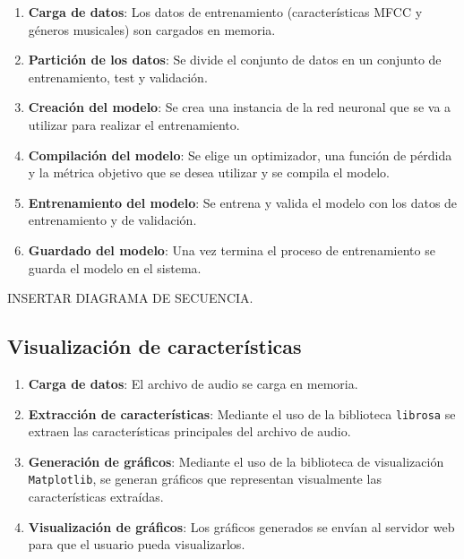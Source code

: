 \begin{enumerate}
\tightlist

\item \textbf{Carga de datos}: Los datos de entrenamiento (características MFCC y géneros musicales) son cargados en memoria.

\item \textbf{Partición de los datos}: Se divide el conjunto de datos en un conjunto de entrenamiento, test y validación.

\item \textbf{Creación del modelo}: Se crea una instancia de la red neuronal que se va a utilizar para realizar el entrenamiento.

\item \textbf{Compilación del modelo}: Se elige un optimizador, una función de pérdida y la métrica objetivo que se desea utilizar y se compila el modelo.

\item \textbf{Entrenamiento del modelo}: Se entrena y valida el modelo con los datos de entrenamiento y de validación.

\item \textbf{Guardado del modelo}: Una vez termina el proceso de entrenamiento se guarda el modelo en el sistema.

\end{enumerate}

INSERTAR DIAGRAMA DE SECUENCIA.

\subsection{Visualización de características}

\begin{enumerate}
\tightlist

\item \textbf{Carga de datos}: El archivo de audio se carga en memoria.

\item \textbf{Extracción de características}: Mediante el uso de la biblioteca \texttt{librosa} se extraen las características principales del archivo de audio.

\item \textbf{Generación de gráficos}: Mediante el uso de la biblioteca de visualización \texttt{Matplotlib}, se generan gráficos que representan visualmente las características extraídas.

\item \textbf{Visualización de gráficos}: Los gráficos generados se envían al servidor web para que el usuario pueda visualizarlos.

\end{enumerate}

